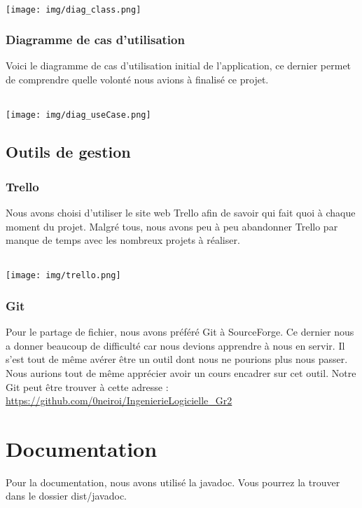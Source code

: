 \documentclass[a4paper,10pt]{report}
\begin{document}
      \paragraph{}
      \texttt{[image: img/diag\_class.png]}
      \newpage
    \section{Diagramme de cas d'utilisation}
      Voici le diagramme de cas d'utilisation initial de l'application, ce dernier permet de comprendre quelle volonté nous avions à finalisé ce projet.
      \paragraph{}
      \texttt{[image: img/diag\_useCase.png]}
  \chapter{Outils de gestion}
    \section{Trello}
      Nous avons choisi d'utiliser le site web Trello afin de savoir qui fait quoi à chaque moment du projet.
      Malgré tous, nous avons peu à peu abandonner Trello par manque de temps avec les nombreux projets à réaliser.
      \paragraph{}
      \texttt{[image: img/trello.png]}
    \section{Git}
      Pour le partage de fichier, nous avons préféré Git à SourceForge. Ce dernier nous a donner beaucoup de difficulté car nous devions apprendre à nous en servir.
      Il s'est tout de même avérer être un outil dont nous ne pourions plus nous passer. Nous aurions tout de même apprécier avoir un cours encadrer sur cet outil.
      Notre Git peut être trouver à cette adresse : \url{https://github.com/0neiroi/IngenierieLogicielle_Gr2}
\part{Documentation}
  Pour la documentation, nous avons utilisé la javadoc. Vous pourrez la trouver dans le dossier dist/javadoc.
\end{document}
